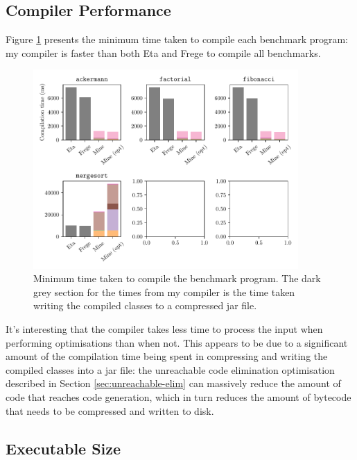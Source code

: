 \documentclass[dissertation.tex]{subfiles}
\begin{document}
{{        
    }
    \subsection{Compiler Performance}
    {
        Figure \ref{fig:compiler-perf} presents the minimum time taken to compile each benchmark program: my compiler is faster than both Eta and Frege to compile all benchmarks.
        
        \begin{figure}[h]
            \centering
            \captionsetup{width=0.8\textwidth}
            \includegraphics[width=0.9\textwidth]{graphs/compiler_perf.pdf}
            \caption{Minimum time taken to compile the benchmark program. The dark grey section for the times from my compiler is the time taken writing the compiled classes to a compressed jar file.}
            \label{fig:compiler-perf}
        \end{figure}
        
        It's interesting that the compiler takes less time to process the input when performing optimisations than when not. This appears to be due to a significant amount of the compilation time being spent in compressing and writing the compiled classes into a jar file: the unreachable code elimination optimisation described in Section \ref{sec:unreachable-elim} can massively reduce the amount of code that reaches code generation, which in turn reduces the amount of bytecode that needs to be compressed and written to disk.
    }
    \subsection{Executable Size}
    {

}}
\end{document}
